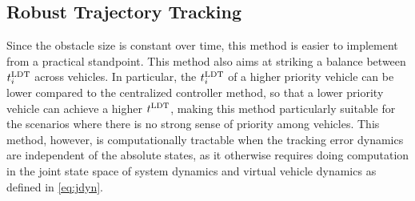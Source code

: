 \subsection{Robust Trajectory Tracking}
Since the obstacle size is constant over time, this method is easier to implement from a practical standpoint. This method also aims at striking a balance between $t^\text{LDT}_i$ across vehicles. In particular, the $t^\text{LDT}_i$ of a higher priority vehicle can be lower compared to the centralized controller method, so that a lower priority vehicle can achieve a higher $t^\text{LDT}$, making this method particularly suitable for the scenarios where there is no strong sense of priority among vehicles. This method, however, is computationally tractable when the tracking error dynamics are independent of the absolute states, as it otherwise requires doing computation in the joint state space of system dynamics and virtual vehicle dynamics as defined in \eqref{eq:jdyn}. 